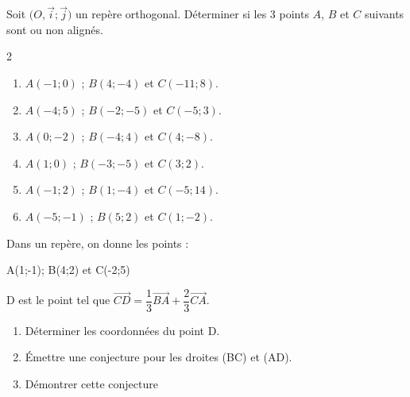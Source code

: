 {%
\begin{Exercice}
Soit $\big(O,\vec i;\vec j\big)$ un repère orthogonal.  Déterminer si les 3 points $A$, $B$ et $C$ suivants sont ou non alignés.
\vspace{-0.5cm}
\begin{multicols}{2}
\begin{enumerate}[itemsep=1em]
	\item \begin{minipage}[t]{\linewidth} $A(-1;0)$ ; $B(4;-4)$ et $C(-11;8)$.\end{minipage}
	\item \begin{minipage}[t]{\linewidth} $A(-4;5)$ ; $B(-2;-5)$ et $C(-5;3)$.\end{minipage}
	\item \begin{minipage}[t]{\linewidth} $A(0;-2)$ ; $B(-4;4)$ et $C(4;-8)$.\end{minipage}
	\item \begin{minipage}[t]{\linewidth} $A(1;0)$ ; $B(-3;-5)$ et $C(3;2)$.\end{minipage}
	\item \begin{minipage}[t]{\linewidth} $A(-1;2)$ ; $B(1;-4)$ et $C(-5;14)$.\end{minipage}
	\item \begin{minipage}[t]{\linewidth} $A(-5;-1)$ ; $B(5;2)$ et $C(1;-2)$.\end{minipage}
\end{enumerate}
\end{multicols}
\end{Exercice}


\begin{Exercice}
Dans un repère, on donne les points :
\begin{center}
A(1;-1); B(4;2) et C(-2;5)
\end{center}
D est le point tel que $ \overrightarrow{CD} = \dfrac{1}{3}\overrightarrow{BA} + \dfrac{2}{3}\overrightarrow{CA} $.
\begin{enumerate}
	\item Déterminer les coordonnées du point D.
	\item Émettre une conjecture pour les droites (BC) et (AD).
	\item Démontrer cette conjecture
\end{enumerate}
\end{Exercice}



}

